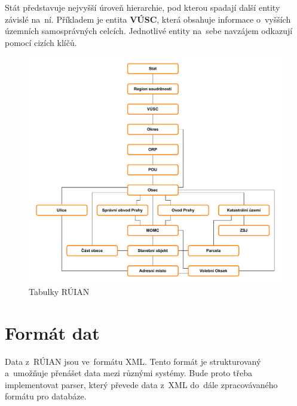 Stát představuje nejvyšší úroveň hierarchie, pod kterou spadají další entity závislé na~ní. 
Příkladem je entita \textbf{VÚSC}, která obsahuje informace o~vyšších územních samosprávných celcích. 
Jednotlivé entity na~sebe navzájem odkazují pomocí cizích klíčů.

\begin{figure}[!h]
    \centering
    \includegraphics[width=\textwidth]{figures/ruian_diagram.pdf}
    \caption{Tabulky RÚIAN}
    \label{fig:ruian_tables}
\end{figure}

\section{Formát dat}
Data z~RÚIAN jsou ve~formátu XML. Tento formát je strukturovaný a~umožňuje přenášet data mezi různými systémy. 
Bude proto třeba implementovat parser, který převede data z~XML do~dále zpracovávaného formátu pro databáze.
